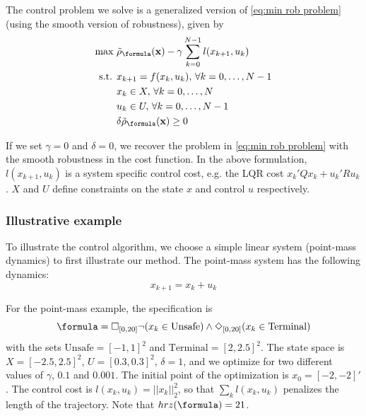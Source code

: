 
The control problem we solve is a generalized version of \eqref{eq:min rob problem} (using the smooth version of robustness), given by
\begin{subequations}
\label{eq:general_ctrl}
\begin{align}
\text{max } & \srob_{\formula}(\sstraj) - \gamma \sum_{k=0}^{N-1} l(x_{k+1},u_{k}) \\
\text{s.t. } & x_{k+1} = f(x_k,u_k), \, \forall k=0,\dotsc,N-1 \\
 & x_k \in X, \, \forall k=0,\dotsc,N \\
 & u_k \in U, \, \forall k=0,\dotsc,N-1 \\
 & \delta \srob_{\formula}(\sstraj) \geq 0
\end{align}
\end{subequations}

If we set $\gamma=0$ and $\delta=0$, we recover the problem in \eqref{eq:min rob problem} with the smooth robustness in the cost function. In the above formulation, $l(x_{k+1},u_{k})$ is a system specific control cost, e.g. the LQR cost $x_k'Qx_k + u_k'Ru_k$. $X$ and $U$ define constraints on the state $x$ and control $u$ respectively. 

\subsubsection{Illustrative example}
\label{sec:illustrative example}
To illustrate the control algorithm, we choose a simple linear system (point-mass dynamics) to first illustrate our method. The point-mass system has the following dynamics:
\begin{equation}
\label{eq:PointMass}
x_{k+1} = x_k + u_k
\end{equation}

For the point-mass example, the specification is 
\[\formula = \always_{[0,20]} \neg (x_k \in \text{Unsafe}) \land \eventually_{[0,20]} (x_k \in \text{Terminal})\]
with the sets $\text{Unsafe}=[-1,1]^2$ and $\text{Terminal}=[2,2.5]^2$. 
The state space is $X=[-2.5,2.5]^2$, $U=[0.3,0.3]^2$, $\delta=1$, and we optimize for two different values of $\gamma$, $0.1$ and $0.001$.
The initial point of the optimization is $x_0=[-2,-2]'$. 
The control cost is $l(x_k,u_k) = ||x_k||_{2}^2$, so that $\sum_kl(x_k,u_k)$ penalizes the length of the trajectory. 
Note that $hrz(\formula) = 21$.

